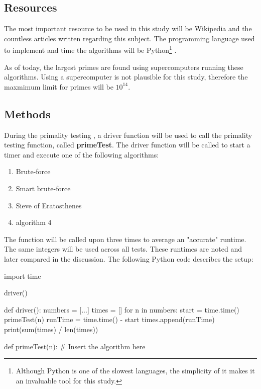 \documentclass[main.tex]{subfiles}
\begin{document}
\subsection{Resources}

The most important resource to be used in this study will be Wikipedia and the countless articles written regarding this subject. The programming language used to implement and time the algorithms will be Python\footnote{Although Python is one of the slowest languages, the simplicity of it makes it an invaluable tool for this study.} \cite{python}.

As of today, the largest primes are found using supercomputers running these algorithms. Using a supercomputer is not plausible for this study, therefore the maxmimum limit for primes will be $10^{14}$.

\subsection{Methods}

During the primality testing \cite{prime:test}, a driver function will be used to call the primality testing function, called \textbf{primeTest}. The driver function will be called to start a timer and execute one of the following algorithms:
\begin{enumerate}
    \item Brute-force%
    \item Smart brute-force %
    \item Sieve of Eratosthenes \cite{prime:sieve}
    \item algorithm 4
\end{enumerate}

The function will be called upon three times to average an "accurate" runtime. The same integers will be used across all tests. These runtimes are noted and later compared in the discussion. The following Python code describes the setup:

\begin{python}
    import time

    driver()

    def driver():
        numbers = [...]
        times = []
        for n in numbers:
            start = time.time()
            primeTest(n)
            runTime = time.time() - start
            times.append(runTime)
        print(sum(times) / len(times))

    def primeTest(n):
        # Insert the algorithm here
\end{python}
\end{document}
